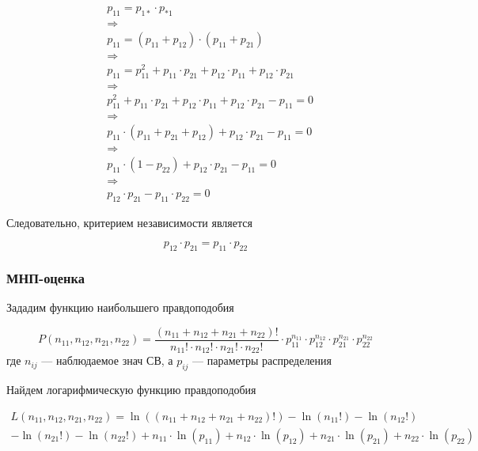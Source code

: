 \documentclass{article}
\begin{document}
    \[
    \begin{aligned}
    & p_{11} = p_{1*} \cdot p_{*1} \\
    & \Rightarrow \\
    & p_{11} = (p_{11} + p_{12}) \cdot (p_{11} + p_{21}) \\
    & \Rightarrow \\
    & p_{11} = p_{11}^{2} + p_{11} \cdot p_{21} + p_{12} \cdot p_{11} + p_{12} \cdot p_{21} \\
    & \Rightarrow \\
    & p_{11}^{2} + p_{11} \cdot p_{21} + p_{12} \cdot p_{11} + p_{12} \cdot p_{21} - p_{11} = 0 \\
    & \Rightarrow \\
    & p_{11} \cdot (p_{11} + p_{21} + p_{12}) + p_{12} \cdot p_{21} - p_{11} = 0 \\
    & \Rightarrow \\
    & p_{11} \cdot (1 - p_{22}) + p_{12} \cdot p_{21} - p_{11} = 0 \\
    & \Rightarrow \\
    & p_{12} \cdot p_{21} - p_{11} \cdot p_{22} = 0
    \end{aligned}
    \]

    \quad

    Следовательно, критерием независимости является

    \begin{equation}
        p_{12} \cdot p_{21} = p_{11} \cdot p_{22}
    \end{equation}

    \subsubsection{МНП-оценка}

    Зададим функцию наибольшего правдоподобия

    \begin{equation}
        P(n_{11}, n_{12}, n_{21}, n_{22}) = \frac{(n_{11} + n_{12} + n_{21} + n_{22})!}{n_{11}! \cdot n_{12}! \cdot n_{21}! \cdot n_{22}!} \cdot p_{11}^{n_{11}} \cdot p_{12}^{n_{12}} \cdot p_{21}^{n_{21}} \cdot p_{22}^{n_{22}}
    \end{equation}
    где $n_{ij}$ --- наблюдаемое знач СВ, а $p_{ij}$ --- параметры распределения

    Найдем логарифмическую функцию правдоподобия

    \begin{multline}
        L(n_{11}, n_{12}, n_{21}, n_{22}) = \ln((n_{11} + n_{12} + n_{21} + n_{22})!) - \ln(n_{11}!) - \ln(n_{12}!) \\
        - \ln(n_{21}!) - \ln(n_{22}!) + n_{11} \cdot \ln(p_{11}) + n_{12} \cdot \ln(p_{12}) + n_{21} \cdot \ln(p_{21}) + n_{22} \cdot \ln(p_{22})
    \end{multline}
\end{document}
